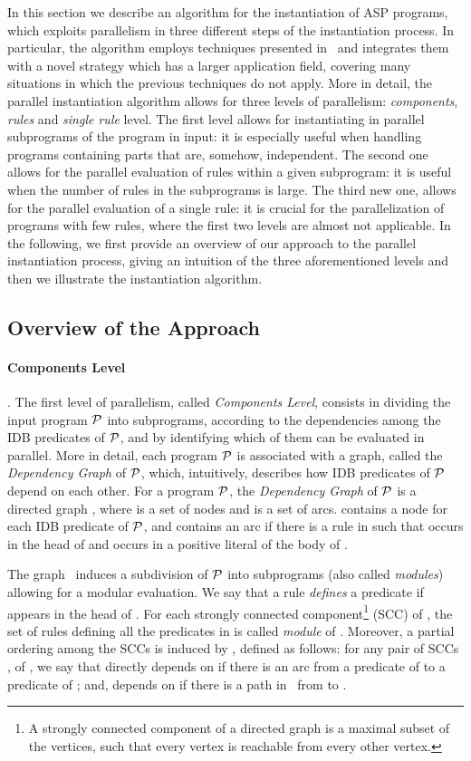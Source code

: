 \documentclass[preprint]{tlp}
\newcommand{\p}{\ensuremath{{\cal P}}\xspace}
\newcommand{\dgp}{\mbox{}}
\begin{document}
In this section we describe an algorithm for the instantiation
of ASP programs, which exploits parallelism in three different
steps of the instantiation process. In particular, the algorithm
employs techniques presented in~\cite{cali-etal-2008-joacil}
and integrates them with a novel strategy which has a
larger application field, covering
many situations in which the previous techniques do not apply.
More in detail, the parallel instantiation algorithm
allows for three levels of parallelism:  {\em components}, {\em rules} and
{\em single rule} level. The first level allows for instantiating in
parallel subprograms of the program in input: it is especially
useful when handling programs containing parts that are,
somehow, independent. The second one allows for
the parallel evaluation of rules within a given subprogram: it is
 useful when the number of rules in the subprograms is large. The
third new one, allows for the parallel evaluation of a single rule:
it is crucial for the parallelization of
programs with few rules, where the first two levels are almost not
applicable.
In the following, we first provide an overview of our approach to the
parallel instantiation process, giving an intuition of the three
aforementioned levels and then we illustrate
the instantiation algorithm.

\subsection{Overview of the Approach}\label{subsec:paroverview}
\paragraph {Components Level}\cite{cali-etal-2008-joacil}.
The first level of parallelism, called {\em Components Level},
consists in dividing the input program \p into subprograms,
according to the dependencies among the IDB predicates of \p, and by
identifying which of them can be evaluated in parallel.
More in detail, each program \p is associated with a graph, called
the {\em Dependency Graph} of \p, which, intuitively, describes how
IDB predicates of \p depend on each other. For a program \p, the
{\em Dependency Graph} of \p is a directed graph , where  is a set of nodes and 
is a set of arcs.  contains a node for each IDB predicate of \p,
and  contains an arc  if there is a rule  in 
such that  occurs in the head of  and  occurs in a positive
literal of the body of .

The graph \dgp\ induces a subdivision of \p into subprograms (also
called {\em modules}) allowing for a modular evaluation. We say that
a rule  {\em defines} a predicate  if  appears in the
head of . For each strongly connected component\footnote{A
strongly connected component of a directed graph is a maximal subset
of the vertices, such that every vertex is reachable from every
other vertex.}
(SCC)  of \dgp , the set of rules defining all the
predicates in  is called {\em module} of .
Moreover, a partial ordering among the SCCs is induced by \dgp,
defined as follows: for any pair of SCCs ,  of \dgp , we say
that  directly depends on  if there is an arc from a predicate
of  to a predicate of ; and,  depends on  if there is a
path in \dgp\ from  to .
\end{document}
